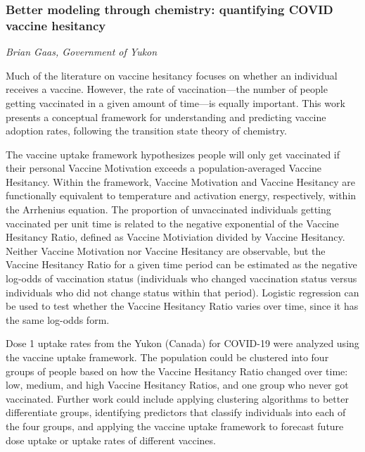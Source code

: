 \subsubsection*{Better modeling through chemistry: quantifying COVID vaccine hesitancy}
\textit{Brian Gaas, Government of Yukon}

Much of the literature on vaccine hesitancy focuses on whether an individual receives a vaccine. However, the rate of vaccination---the number of people getting vaccinated in a given amount of time---is equally important. This work presents a conceptual framework for understanding and predicting vaccine adoption rates, following the transition state theory of chemistry. 

The vaccine uptake framework hypothesizes people will only get vaccinated if their personal Vaccine Motivation exceeds a population-averaged Vaccine Hesitancy. Within the framework, Vaccine Motivation and Vaccine Hesitancy are functionally equivalent to temperature and activation energy, respectively, within the Arrhenius equation. The proportion of unvaccinated individuals getting vaccinated per unit time is related to the negative exponential of the Vaccine Hesitancy Ratio, defined as Vaccine Motiviation divided by Vaccine Hesitancy. Neither Vaccine Motivation nor Vaccine Hesitancy are observable, but the Vaccine Hesitancy Ratio for a given time period can be estimated as the negative log-odds of vaccination status (individuals who changed vaccination status versus individuals who did not change status within that period). Logistic regression can be used to test whether the Vaccine Hesitancy Ratio varies over time, since it has the same log-odds form. 

Dose 1 uptake rates from the Yukon (Canada) for COVID-19 were analyzed using the vaccine uptake framework. The population could be clustered into four groups of people based on how the Vaccine Hesitancy Ratio changed over time: low, medium, and high Vaccine Hesitancy Ratios, and one group who never got vaccinated. Further work could include applying clustering algorithms to better differentiate groups, identifying predictors that classify individuals into each of the four groups, and applying the vaccine uptake framework to forecast future dose uptake or uptake rates of different vaccines.